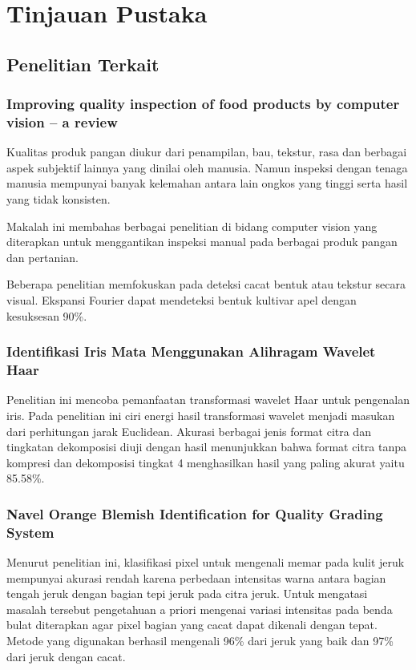 \documentclass[laporan.tex]{subfiles}
\begin{document}
\chapter{Tinjauan Pustaka}

\section{Penelitian Terkait}

\subsection{Improving quality inspection of food products by computer vision – a review}

Kualitas produk pangan diukur dari penampilan, bau, tekstur, rasa dan berbagai aspek subjektif lainnya yang dinilai oleh manusia. Namun inspeksi dengan tenaga manusia mempunyai banyak kelemahan antara lain ongkos yang tinggi serta  hasil yang tidak konsisten.

Makalah ini\cite{brosnan} membahas berbagai penelitian di bidang computer vision yang diterapkan untuk menggantikan inspeksi manual pada berbagai produk pangan dan pertanian.

Beberapa penelitian memfokuskan pada deteksi cacat bentuk atau tekstur secara visual. Ekspansi Fourier dapat mendeteksi bentuk kultivar apel dengan kesuksesan 90\%.

\subsection{Identifikasi Iris Mata Menggunakan Alihragam Wavelet Haar}

Penelitian ini mencoba pemanfaatan transformasi wavelet Haar untuk pengenalan iris. Pada penelitian ini ciri energi hasil transformasi wavelet menjadi masukan dari perhitungan jarak Euclidean. Akurasi berbagai jenis format citra dan tingkatan dekomposisi diuji dengan hasil menunjukkan bahwa format citra tanpa kompresi dan dekomposisi tingkat 4 menghasilkan hasil yang paling akurat yaitu 85.58\%.\cite{prihartono}

\subsection{Navel Orange Blemish Identification for Quality Grading System}

Menurut penelitian ini, klasifikasi pixel untuk mengenali memar pada kulit jeruk mempunyai akurasi rendah karena perbedaan intensitas warna antara bagian tengah jeruk dengan bagian tepi jeruk pada citra jeruk. Untuk mengatasi masalah tersebut pengetahuan a priori mengenai variasi intensitas pada benda bulat diterapkan agar pixel bagian yang cacat dapat dikenali dengan tepat. Metode yang digunakan berhasil mengenali 96\% dari jeruk yang baik dan 97\% dari jeruk dengan cacat.
\end{document}
